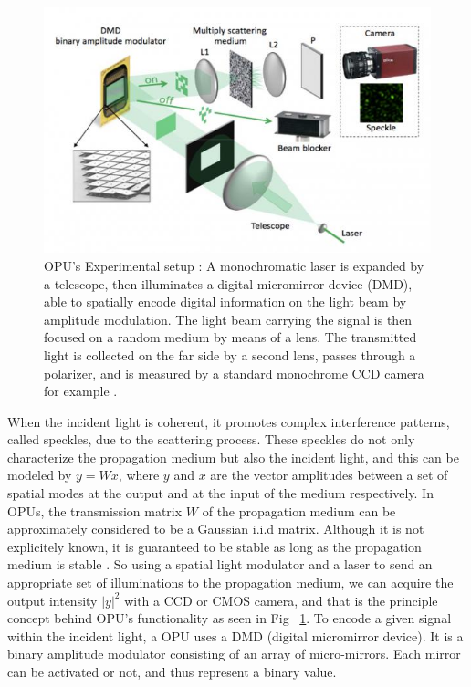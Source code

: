 \begin{figure}[ht!]
\begin{center}
\includegraphics[scale=0.5]{figs/lighton630.jpg}
\end{center}
\caption[OPU's Experimental setup]{OPU's Experimental setup \citep{saade_opu}: A monochromatic laser is expanded by a telescope, then
illuminates a digital micromirror device (DMD), able to spatially encode digital information on the light beam by
amplitude modulation. The light beam carrying the signal is then focused on a random
medium by means of a lens. The transmitted light is collected on the
far side by a second lens, passes through a polarizer, and is measured by a standard monochrome CCD camera for example .}
\label{fig_opu}
\end{figure}
When the incident light is coherent, it promotes complex interference patterns, called speckles, due to the scattering process.
These speckles do not only characterize the propagation medium but also the incident light, and this can be modeled by $y=Wx$, 
where $y$ and $x$ are the vector amplitudes between a set of spatial modes at the output and at the input of the medium respectively. In OPUs, the transmission matrix $W$ of the propagation medium can be approximately considered to be a Gaussian i.i.d matrix. Although it is not explicitely known, it is guaranteed to be stable as long as the propagation medium is stable \citep{saade_opu}.  So using a spatial light modulator and a laser to send an appropriate set of illuminations to the propagation medium, we can acquire the output intensity $|y|^2$ with a CCD or CMOS camera, and that is the principle concept behind OPU's functionality as seen in Fig~ \ref{fig_opu}. To encode a given signal within the incident light, a OPU uses a DMD (digital micromirror device). It is a binary amplitude modulator consisting of an array of micro-mirrors. Each mirror can be activated or not, and thus represent a binary value. %
